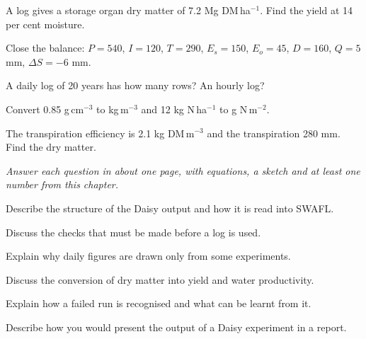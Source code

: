 \begin{exlist}
\item A log gives a storage organ dry matter of 7.2 Mg DM\,ha$^{-1}$. Find the yield at 14 per cent moisture.
\item Close the balance: $P=540$, $I=120$, $T=290$, $E_s=150$, $E_o=45$, $D=160$, $Q=5$ mm, $\Delta S=-6$ mm.
\item A daily log of 20 years has how many rows? An hourly log?
\item Convert 0.85 g\,cm$^{-3}$ to kg\,m$^{-3}$ and 12 kg N\,ha$^{-1}$ to g N\,m$^{-2}$.
\item The transpiration efficiency is 2.1 kg DM\,m$^{-3}$ and the transpiration 280 mm. Find the dry matter.
\end{exlist}
{\small\itshape Answer each question in about one page, with equations, a sketch and at least one number from this chapter.}\par\vspace{3pt}
\begin{exlist}
\item Describe the structure of the Daisy output and how it is read into SWAFL.
\item Discuss the checks that must be made before a log is used.
\item Explain why daily figures are drawn only from some experiments.
\item Discuss the conversion of dry matter into yield and water productivity.
\item Explain how a failed run is recognised and what can be learnt from it.
\item Describe how you would present the output of a Daisy experiment in a report.
\end{exlist}
